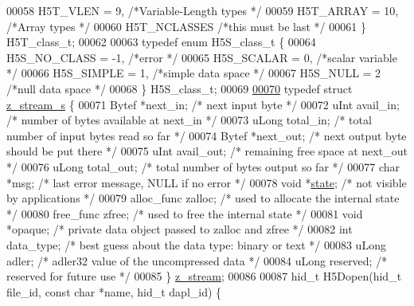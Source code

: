 \begin{DoxyCode}
00058     H5T\_VLEN             = 9,   \textcolor{comment}{/*Variable-Length types                      */}
00059     H5T\_ARRAY            = 10,  \textcolor{comment}{/*Array types                                */}
00060     H5T\_NCLASSES                \textcolor{comment}{/*this must be last                          */}
00061 \} H5T\_class\_t;
00062 
00063 \textcolor{keyword}{typedef} \textcolor{keyword}{enum} H5S\_class\_t \{
00064     H5S\_NO\_CLASS         = -1,  \textcolor{comment}{/*error                                      */}
00065     H5S\_SCALAR           = 0,   \textcolor{comment}{/*scalar variable                            */}
00066     H5S\_SIMPLE           = 1,   \textcolor{comment}{/*simple data space                          */}
00067     H5S\_NULL             = 2    \textcolor{comment}{/*null data space                            */}
00068 \} H5S\_class\_t;
00069 
\hyperlink{structz__stream__s}{00070} \textcolor{keyword}{typedef} \textcolor{keyword}{struct }\hyperlink{structz__stream__s}{z\_stream\_s} \{
00071     Bytef    *next\_in; \textcolor{comment}{/* next input byte */}
00072     uInt     avail\_in; \textcolor{comment}{/* number of bytes available at next\_in */}
00073     uLong    total\_in; \textcolor{comment}{/* total number of input bytes read so far */}
00074     Bytef   *next\_out; \textcolor{comment}{/* next output byte should be put there */}
00075     uInt    avail\_out; \textcolor{comment}{/* remaining free space at next\_out */}
00076     uLong   total\_out; \textcolor{comment}{/* total number of bytes output so far */}
00077     \textcolor{keywordtype}{char}         *msg; \textcolor{comment}{/* last error message, NULL if no error */}
00078     \textcolor{keywordtype}{void}       *\hyperlink{structstate}{state}; \textcolor{comment}{/* not visible by applications */}
00079     alloc\_func zalloc; \textcolor{comment}{/* used to allocate the internal state */}
00080     free\_func   zfree; \textcolor{comment}{/* used to free the internal state */}
00081     \textcolor{keywordtype}{void}      *opaque; \textcolor{comment}{/* private data object passed to zalloc and zfree */}
00082     \textcolor{keywordtype}{int}     data\_type; \textcolor{comment}{/* best guess about the data type: binary or text */}
00083     uLong       adler; \textcolor{comment}{/* adler32 value of the uncompressed data */}
00084     uLong    reserved; \textcolor{comment}{/* reserved for future use */}
00085 \} \hyperlink{structz__stream__s}{z\_stream};
00086 
00087 hid\_t H5Dopen(hid\_t file\_id, \textcolor{keyword}{const} \textcolor{keywordtype}{char} *name, hid\_t dapl\_id) \{

\end{DoxyCode}
